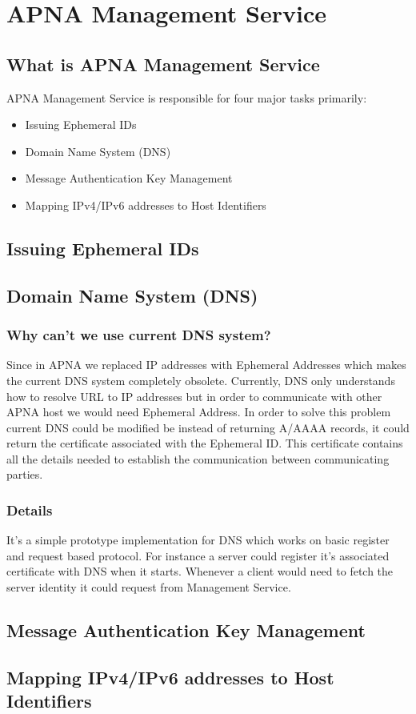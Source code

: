 
\chapter{APNA Management Service} %

\label{apnams} %

\section{What is APNA Management Service}
APNA Management Service is responsible for four major tasks primarily:

\begin{itemize}
    \item Issuing Ephemeral IDs
    \item Domain Name System (DNS)
    \item Message Authentication Key Management
    \item Mapping IPv4/IPv6 addresses to Host Identifiers
\end{itemize}

\section{Issuing Ephemeral IDs}

\section{Domain Name System (DNS)}
\subsection{Why can't we use current DNS system?}
Since in APNA we replaced IP addresses with Ephemeral Addresses which makes the current DNS system completely obsolete. Currently, DNS only understands how to resolve URL to IP addresses but in order to communicate with other APNA host we would need Ephemeral Address. In order to solve this problem current DNS could be modified be instead of returning A/AAAA records, it could return the certificate associated with the Ephemeral ID. This certificate contains all the details needed to establish the communication between communicating parties.

\subsection{Details}
It's a simple prototype implementation for DNS which works on basic register and request based protocol. For instance a server could register it's associated certificate with DNS when it starts. Whenever a client would need to fetch the server identity it could request from Management Service.

\section{Message Authentication Key Management}

\section{Mapping IPv4/IPv6 addresses to Host Identifiers}